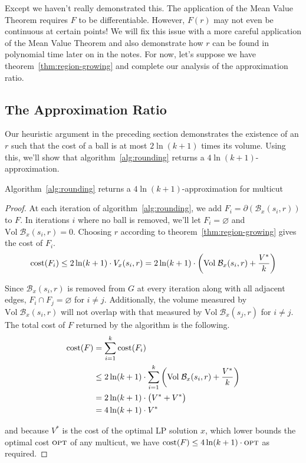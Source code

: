 Except we haven't really demonstrated this. The application of the Mean Value Theorem requires $F$ to be differentiable. However, $F(r)$ may not even be continuous at certain points! We will fix this issue with a more careful application of the Mean Value Theorem and also demonstrate how $r$ can be found in polynomial time later on in the notes. For now, let's suppose we have theorem~\ref{thm:region-growing} and complete our analysis of the approximation ratio.


\subsection{The Approximation Ratio}

Our heuristic argument in the preceding section demonstrates the existence of an $r$ such that the cost of a ball is at most $2 \ln(k+1)$ times its volume. Using this, we'll show that algorithm~\ref{alg:rounding} returns a $4 \ln(k+1)$-approximation.

\begin{theorem}\label{thm:approx-ratio}
Algorithm~\ref{alg:rounding} returns a $4 \ln(k+1)$-approximation for multicut
\end{theorem}
\begin{proof}
At each iteration of algorithm~\ref{alg:rounding}, we add $F_i = \partial(\mathcal{B}_x(s_i, r))$ to $F$. In iterations $i$ where no ball is removed, we'll let $F_i = \varnothing$ and $\text{Vol} \; \mathcal{B}_x(s_i, r) = 0$. Choosing $r$ according to theorem~\ref{thm:region-growing} gives the cost of $F_i$.
\begin{equation*}
\textup{cost}(F_i)
\leq 2 \ln(k+1) \cdot V_x(s_i, r)
= 2 \ln(k+1) \cdot \bigg( \text{Vol} \; \mathcal{B}_x(s_i, r) + \frac{V^*}{k} \bigg)
\end{equation*}

Since $\mathcal{B}_x(s_i, r)$ is removed from $G$ at every iteration along with all adjacent edges, $F_i \cap F_j = \varnothing$ for $i \neq j$. Additionally, the volume measured by $\text{Vol} \; \mathcal{B}_x(s_i, r)$ will not overlap with that measured by $\text{Vol} \; \mathcal{B}_x(s_j, r)$ for $i \neq j$. The total cost of $F$ returned by the algorithm is the following.
\begin{align*}
\textup{cost}(F)
&= \sum_{i=1}^k \textup{cost}(F_i) \\
&\leq 2 \ln(k+1) \cdot \sum_{i=1}^k \bigg( \text{Vol} \; \mathcal{B}_x(s_i, r) + \frac{V^*}{k} \bigg) \\
&= 2 \ln(k+1) \cdot \big( V^* + V^* \big) \\
&= 4 \ln(k+1) \cdot V^*
\end{align*}

and because $V^*$ is the cost of the optimal LP solution $x$, which lower bounds the optimal cost $\textup{\textsc{opt}}$ of any multicut, we have $\textup{cost}(F) \leq 4 \ln(k+1) \cdot \textup{\textsc{opt}}$ as required.
\end{proof}

